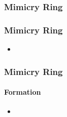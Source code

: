 \subsubsection{Mimicry Ring}

\frame
{
	\frametitle{Mimicry Ring}
	
	\begin{itemize}
		\item 
	\end{itemize}	
}

\frame
{
	\frametitle{Mimicry Ring}
	\framesubtitle{Formation}
	
	\begin{itemize}
		\item 
	\end{itemize}
}